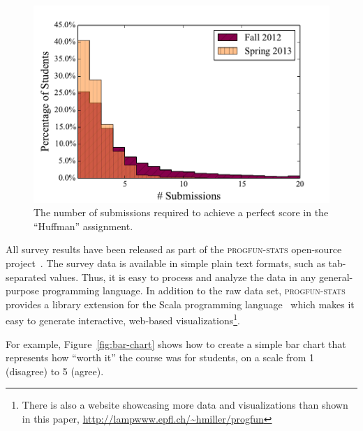 \documentclass{sig-alternate}
\begin{document}
\begin{figure}[ht!]
  \centering
  \includegraphics[width=\columnwidth]{plots/top-scores-submissions-histogram.pdf}
  \vspace{-0.7cm}
  \caption{The number of submissions required to achieve a perfect score in the ``Huffman'' assignment.}
  \label{fig:top-scores-submissions}
\end{figure}

All survey results have been released as part of the \textsc{progfun-stats} open-source
project~\cite{progfun-stats}. The survey data is available in simple
plain text formats, such  as tab-separated values. Thus, it is easy to process
and analyze the data in any general-purpose programming language. In addition
to the raw data set, \textsc{progfun-stats} provides a library extension for
the Scala programming language~\cite{Odersky-Spoon-Venners07} which makes it
easy to generate interactive, web-based visualizations\footnote{There is also a website showcasing more data and visualizations than shown in this paper, \url{http://lampwww.epfl.ch/~hmiller/progfun}}.

For example, Figure~\ref{fig:bar-chart} shows how to create a simple bar chart
that represents how ``worth it'' the course was for students, on a scale from
1 (disagree) to 5 (agree).


\end{document}
